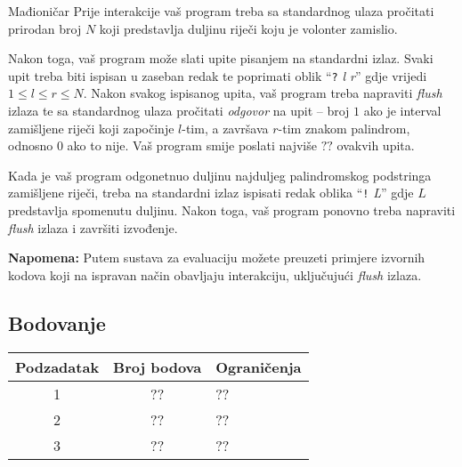 \begin{statement}[
  problempoints=100,
  timelimit=1 sekunda,
  memorylimit=512 MiB,
]{Mađioničar}
Prije interakcije vaš program treba sa standardnog ulaza pročitati
prirodan broj $N$ koji predstavlja duljinu riječi koju je volonter
zamislio.

Nakon toga, vaš program može slati upite pisanjem na standardni izlaz. Svaki
upit treba biti ispisan u zaseban redak te poprimati oblik
``\texttt{?} \textit{l r}''
gdje vrijedi $1 \le l \le r \le N$. Nakon svakog ispisanog upita, vaš program
treba napraviti \textit{flush} izlaza te sa standardnog ulaza pročitati
\textit{odgovor} na upit -- broj $1$ ako je interval zamišljene riječi koji
započinje $l$-tim, a završava $r$-tim znakom palindrom, odnosno $0$ ako to
nije. Vaš program smije poslati najviše $??$ ovakvih upita.

Kada je vaš program odgonetnuo duljinu najduljeg palindromskog podstringa
zamišljene riječi, treba na standardni izlaz ispisati redak oblika
``\texttt{!} \textit{L}'' gdje $L$ predstavlja spomenutu duljinu. Nakon toga,
vaš program ponovno treba napraviti \textit{flush} izlaza i završiti
izvođenje.

\textbf{Napomena:} Putem sustava za evaluaciju možete preuzeti primjere
izvornih kodova koji na ispravan način obavljaju interakciju, uključujući
\textit{flush} izlaza.

\subsection*{Bodovanje}

{\renewcommand{\arraystretch}{1.4}
  \setlength{\tabcolsep}{6pt}
  \begin{tabular}{ccl}
   Podzadatak & Broj bodova & Ograničenja \\ \midrule
    1 & ?? & ?? \\
    2 & ?? & ?? \\
    3 & ?? & ??
\end{tabular}}


\end{statement}
